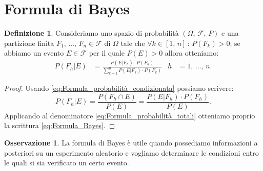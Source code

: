 \documentclass[12pt,openany]{amsbook}
\theoremstyle{plain}
\numberwithin{equation}{section} %
\theoremstyle{definition}
\newtheorem{defn}[thm]{Definizione}
\newtheorem{obsv}[thm]{Osservazione}
\begin{document}
        \section{Formula di Bayes}
            \begin{defn}\label{defn:Formula_Bayes}
                Consideriamo uno spazio di probabilità $(\Omega,\,\mathscr{F},\,P)$ e una partizione finita $F_1,\,\ldots,\,F_n \in \mathscr{F}$ di $\Omega$ tale che $\forall k \in [1,\,n] \,:\, P(F_k) > 0$; se abbiamo un evento $E \in \mathscr{F}$ per il quale $P(E) > 0$ allora otteniamo:
                \begin{align}\label{eq:Formula_Bayes}
                    P(F_h|E) &= \frac{P(E|F_h) \cdot P(F_h)}{\sum_{k=1}^{n} P(E|F_k) \cdot P(F_k)} & h &= 1,\,\ldots,\,n
                .
                \end{align}
            \end{defn}
            \begin{proof}
                Usando \eqref{eq:Formula_probabilità_condizionata} possiamo scrivere: \[
                    P(F_h|E) = \frac{P(F_h \cap E)}{P(E)} = \frac{P(E|F_h) \cdot P(F_h)}{P(E)}
                .\] 
                Applicando al denominatore \eqref{eq:Formula_probabilità_totali} otteniamo proprio la scrittura \eqref{eq:Formula_Bayes}.
            \end{proof}
            \begin{obsv}
                La formula di Bayes è utile quando possediamo informazioni a posteriori su un esperimento aleatorio e vogliamo determinare le condizioni entro le quali si sia verificato un certo evento.
            \end{obsv}
\end{document}
